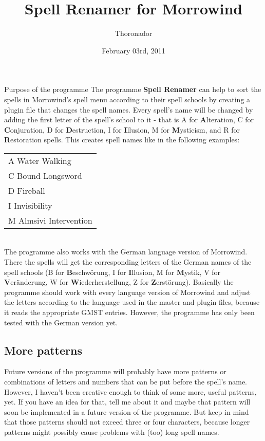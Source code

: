 \documentclass[12pt,oneside,a4paper]{article}
\title{Spell Renamer for Morrowind}
\author{Thoronador}
\date{February 03rd, 2011}
\begin{document}
\maketitle

\begin{section}{Purpose of the programme}
The programme \textbf{Spell Renamer} can help to sort the spells in Morrowind's
spell menu according to their spell schools by creating a plugin file that
changes the spell names.
Every spell's name will be changed by adding the first letter of the spell's school
to it - that is A for \textbf{A}lteration, C for \textbf{C}onjuration,
D for \textbf{D}estruction, I for \textbf{I}llusion, M for \textbf{M}ysticism,
and R for \textbf{R}estoration spells.
This creates spell names like in the following examples:\\

\begin{tabular}{l}
A Water Walking\\
C Bound Longsword\\
D Fireball\\
I Invisibility\\
M Almsivi Intervention\\
\end{tabular}
\\

The programme also works with the German language version of Morrowind. There
the spells will get the corresponding letters of the German names of the spell
schools (B for \textbf{B}eschw\"{o}rung, I for \textbf{I}llusion, M for
\textbf{M}ystik, V for \textbf{V}er\"{a}nderung, W for \textbf{W}iederherstellung,
Z for \textbf{Z}erst\"{o}rung).
Basically the programme should work with every language version of Morrowind and
adjust the letters according to the language used in the master and plugin files,
because it reads the appropriate GMST entries. However, the programme has only
been tested with the German version yet.

\subsection{More patterns}
Future versions of the programme will probably have more patterns or combinations
of letters and numbers that can be put before the spell's name. However, I haven't
been creative enough to think of some more, useful patterns, yet. If you have an
idea for that, tell me about it and maybe that pattern will soon be implemented
in a future version of the programme. But keep in mind that those patterns
should not exceed three or four characters, because longer patterns might
possibly cause problems with (too) long spell names.


\end{section}
\end{document}
